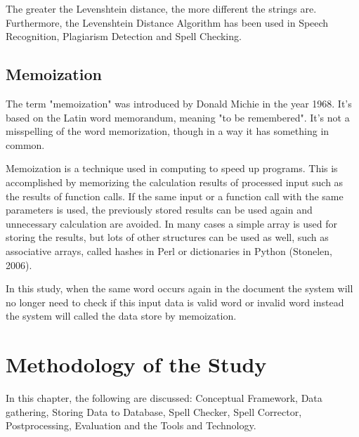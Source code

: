 \documentclass[12pt]{book}
\begin{document}
The greater the Levenshtein distance, the more different the strings are. Furthermore, the Levenshtein Distance Algorithm has been used in Speech Recognition, Plagiarism Detection and Spell Checking. %


\section{Memoization}
The term "memoization" was introduced by Donald Michie in the year 1968. It's based on the Latin word memorandum, meaning "to be remembered". It's not a misspelling of the word memorization, though in a way it has something in common.

Memoization is a technique used in computing to speed up programs. This is accomplished by memorizing the calculation results of processed input such as the results of function calls. If the same input or a function call with the same parameters is used, the previously stored results can be used again and unnecessary calculation are avoided. In many cases a simple array is used for storing the results, but lots of other structures can be used as well, such as associative arrays, called hashes in Perl or dictionaries in Python (Stonelen, 2006).

In this study, when the same word occurs again in the document the system will no longer need to check if this input data is valid word or invalid word instead the system will called the data store by memoization.

\let\cleardoublepage\clearpage
\chapter{Methodology of the Study}

In this chapter, the following are discussed: Conceptual Framework, Data gathering, Storing Data to Database, Spell Checker, Spell Corrector, Postprocessing, Evaluation and the Tools and Technology.
\end{document}
